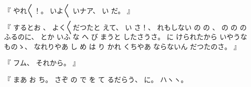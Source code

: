 %
『
やれ〳〵！。
%
いよ〳〵
いナア、
%
い
だ。
』

%
『
するとお
、
%
よく〳〵だつたと
えて、
%
い
さ！、
%
れもしない
の
の
、
%
の
の
の
ふるのに、
%
とか
いふ
な
へ
び
まうと
したさうさ。
%
に%
けられたから
いやうなものゝ、
%
なれりやあ
し
め
は
り
かれ
%
くちやあ
ならないん
だつたのさ。
』

%
『
フム、
%
それから。
』

%
『
まあ
お
ち。
%
さぞ
の
で
を
て
るだらう、
%
に。%
%
ハヽヽ。

